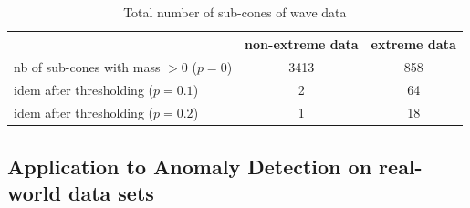 \begin{table}[!ht]
\caption{Total number of sub-cones of wave data}
\label{jmva:fig:wavedata-nb-faces}
\centering
\begin{tabular}{lcc}
\toprule
~ & non-extreme data & extreme data \\
\midrule
nb of sub-cones with mass $>0$ ($p = 0$) & 3413 & 858 \\
idem after thresholding ($p = 0.1$) & 2 & 64 \\
idem after thresholding ($p = 0.2$) & 1 & 18 \\ 
\bottomrule
\end{tabular}
\end{table}


\subsection{Application to Anomaly Detection on real-world data sets}

